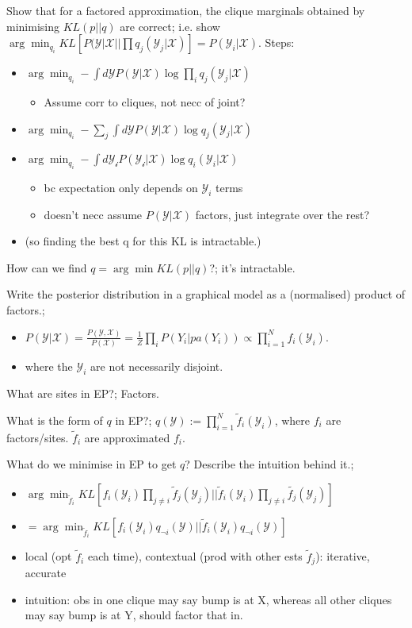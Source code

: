 \documentclass{article}
\begin{document}
Show that for a factored approximation, the clique marginals obtained by minimising $KL(p||q)$ are correct; i.e. show $\arg\min_{q_i} KL[P(\mathcal{Y}|\mathcal{X}||\prod q_j(\mathcal{Y}_j|\mathcal{X})]=P(\mathcal{Y}_i|\mathcal{X})$. Steps: \begin{itemize}
    \item $\arg\min_{q_i}-\int d\mathcal{Y}P(\mathcal{Y}|\mathcal{X})\log \prod_iq_j(\mathcal{Y}_j|\mathcal{X})$
    \begin{itemize}
        \item Assume corr to cliques, not necc of joint?
    \end{itemize}
    \item $\arg\min_{q_i}-\sum_j \int d\mathcal{Y}P(\mathcal{Y}|\mathcal{X})\log q_j(\mathcal{Y}_j|\mathcal{X})$
    \item $\arg\min_{q_i}-\int d\mathcal{Y_i}P(\mathcal{Y_i}|\mathcal{X})\log q_i(\mathcal{Y}_i|\mathcal{X})$
    \begin{itemize}
        \item bc expectation only depends on $\mathcal{Y}_i$ terms
        \item doesn't necc assume $P(\mathcal{Y}|\mathcal{X})$ factors, just integrate over the rest?
    \end{itemize}
    \item (so finding the best q for this KL is intractable.)
\end{itemize}

How can we find $q=\arg\min KL(p||q)$?; it's intractable.

Write the posterior distribution in a graphical model as a (normalised) product of factors.;\begin{itemize}
    \item  $P(\mathcal{Y}|\mathcal{X})=\frac{P(\mathcal{Y}, \mathcal{X})}{P(\mathcal{X})}=\frac{1}{Z}\prod_i P(Y_i|pa(Y_i))\propto \prod_{i=1}^N f_i(\mathcal{Y}_i)$.
    \item where the $\mathcal{Y}_i$ are not necessarily disjoint.
\end{itemize}

What are sites in EP?; Factors.

What is the form of $q$ in EP?; $q(\mathcal{Y}):=\prod_{i=1}^N\tilde{f}_i(\mathcal{Y}_i)$, where $f_i$ are factors/sites. $\tilde{f}_i$ are approximated $f_i$.

What do we minimise in EP to get $q$? Describe the intuition behind it.; \begin{itemize}
    \item $\arg\min_{\tilde{f}_i}KL[f_i(\mathcal{Y}_i)\prod_{j\ne i}\tilde{f}_j(\mathcal{Y}_j)||\tilde{f}_i(\mathcal{Y}_i)\prod_{j\ne i}\tilde{f_j}(\mathcal{Y}_j)]$
    \item $=\arg\min_{\tilde{f}_i}KL[f_i(\mathcal{Y}_i)q_{\neg i}(\mathcal{Y})||\tilde{f}_i(\mathcal{Y}_i)q_{\neg i}(\mathcal{Y})]$
    \item local (opt $\tilde{f}_i$ each time), contextual (prod with other ests $\tilde{f}_j$): iterative, accurate
    \item intuition: obs in one clique may say bump is at X, whereas all  other cliques may say bump is at Y, should factor that in.
\end{itemize}
\end{document}
